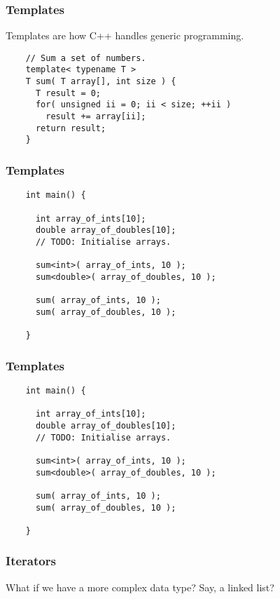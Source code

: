 \begin{frame}[fragile]
  \frametitle{Templates}
  Templates are how C++ handles generic programming.
  \begin{example}
    \begin{lstlisting}
    // Sum a set of numbers.
    template< typename T >
    T sum( T array[], int size ) {
      T result = 0;
      for( unsigned ii = 0; ii < size; ++ii )
        result += array[ii];
      return result;
    }
    \end{lstlisting}
  \end{example}
\end{frame}

\begin{frame}[fragile]
  \frametitle{Templates}
  \begin{example}
    \begin{lstlisting}
    int main() {

      int array_of_ints[10];
      double array_of_doubles[10];
      // TODO: Initialise arrays.

      sum<int>( array_of_ints, 10 );
      sum<double>( array_of_doubles, 10 );

      sum( array_of_ints, 10 );
      sum( array_of_doubles, 10 );

    }
    \end{lstlisting}
  \end{example}
\end{frame}

\begin{frame}[fragile]
  \frametitle{Templates}
  \begin{example}
    \begin{lstlisting}
    int main() {

      int array_of_ints[10];
      double array_of_doubles[10];
      // TODO: Initialise arrays.

      sum<int>( array_of_ints, 10 );
      sum<double>( array_of_doubles, 10 );

      sum( array_of_ints, 10 );
      sum( array_of_doubles, 10 );

    }
    \end{lstlisting}
  \end{example}
\end{frame}

\begin{frame}[fragile]
  \frametitle{Iterators}
  What if we have a more complex data type? Say, a linked list?
\end{frame}

